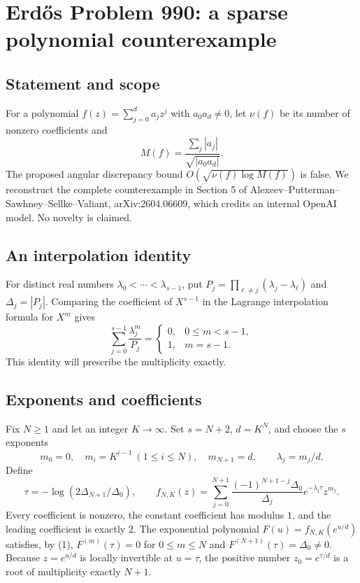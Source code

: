 \section*{Erd\H{o}s Problem 990: a sparse polynomial counterexample}
\subsection*{Statement and scope}
For a polynomial $f(z)=\sum_{j=0}^{d}a_jz^j$ with $a_0a_d\ne0$, let $\nu(f)$ be its number of nonzero coefficients and
\[
 M(f)=\frac{\sum_j|a_j|}{\sqrt{|a_0a_d|}}.
\]
The proposed angular discrepancy bound $O(\sqrt{\nu(f)\log M(f)})$ is false. We reconstruct the complete counterexample in Section 5 of Alexeev--Putterman--Sawhney--Sellke--Valiant, arXiv:2604.06609, which credits an internal OpenAI model. No novelty is claimed.

\subsection*{An interpolation identity}
For distinct real numbers $\lambda_0<\cdots<\lambda_{s-1}$, put
$P_j=\prod_{\ell\ne j}(\lambda_j-\lambda_\ell)$ and $\Delta_j=|P_j|$.
Comparing the coefficient of $X^{s-1}$ in the Lagrange interpolation formula for $X^m$ gives
\[
 \sum_{j=0}^{s-1}\frac{\lambda_j^m}{P_j}
 =
 \begin{cases}0,&0\le m<s-1,\\1,&m=s-1.\end{cases}
 \tag{1}
\]
This identity will prescribe the multiplicity exactly.

\subsection*{Exponents and coefficients}
Fix $N\ge1$ and let an integer $K\to\infty$. Set $s=N+2$, $d=K^N$, and choose the $s$ exponents
\[
 m_0=0,\quad m_i=K^{i-1}\ (1\le i\le N),\quad m_{N+1}=d,
 \qquad \lambda_j=m_j/d.
\]
Define
\[
 \tau=-\log(2\Delta_{N+1}/\Delta_0),\qquad
 f_{N,K}(z)=\sum_{j=0}^{N+1}
 \frac{(-1)^{N+1-j}\Delta_0}{\Delta_j}e^{-\lambda_j\tau}z^{m_j}.
 \tag{2}
\]
Every coefficient is nonzero, the constant coefficient has modulus $1$, and the leading coefficient is exactly $2$.
The exponential polynomial $F(u)=f_{N,K}(e^{u/d})$ satisfies, by (1),
$F^{(m)}(\tau)=0$ for $0\le m\le N$ and $F^{(N+1)}(\tau)=\Delta_0\ne0$.
Because $z=e^{u/d}$ is locally invertible at $u=\tau$, the positive number
$z_0=e^{\tau/d}$ is a root of multiplicity exactly $N+1$.

